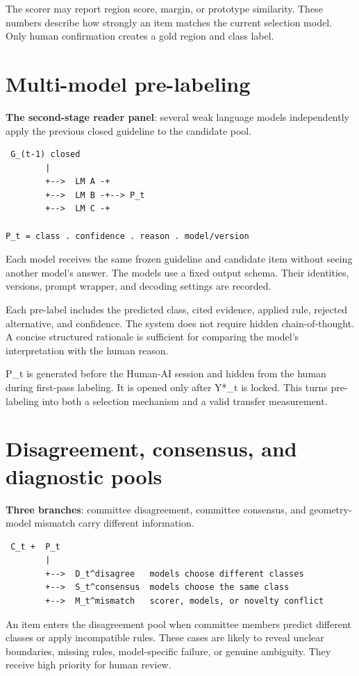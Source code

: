 The scorer may report region score, margin, or prototype similarity. These numbers describe how strongly an item matches the current selection model. Only human confirmation creates a gold region and class label.


\section{Multi-model pre-labeling}
\textbf{The second-stage reader panel}: several weak language models independently apply the previous closed guideline to the candidate pool.

\begin{verbatim}
 G_(t-1) closed
        |
        +-->  LM A -+
        +-->  LM B -+--> P_t
        +-->  LM C -+

P_t = class . confidence . reason . model/version
\end{verbatim}
Each model receives the same frozen guideline and candidate item without seeing another model's answer. The models use a fixed output schema. Their identities, versions, prompt wrapper, and decoding settings are recorded.

Each pre-label includes the predicted class, cited evidence, applied rule, rejected alternative, and confidence. The system does not require hidden chain-of-thought. A concise structured rationale is sufficient for comparing the model's interpretation with the human reason.

P_t is generated before the Human-AI session and hidden from the human during first-pass labeling. It is opened only after Y*_t is locked. This turns pre-labeling into both a selection mechanism and a valid transfer measurement.


\section{Disagreement, consensus, and diagnostic pools}
\textbf{Three branches}: committee disagreement, committee consensus, and geometry-model mismatch carry different information.

\begin{verbatim}
 C_t +  P_t
        |
        +-->  D_t^disagree   models choose different classes
        +-->  S_t^consensus  models choose the same class
        +-->  M_t^mismatch   scorer, models, or novelty conflict
\end{verbatim}
An item enters the disagreement pool when committee members predict different classes or apply incompatible rules. These cases are likely to reveal unclear boundaries, missing rules, model-specific failure, or genuine ambiguity. They receive high priority for human review.

